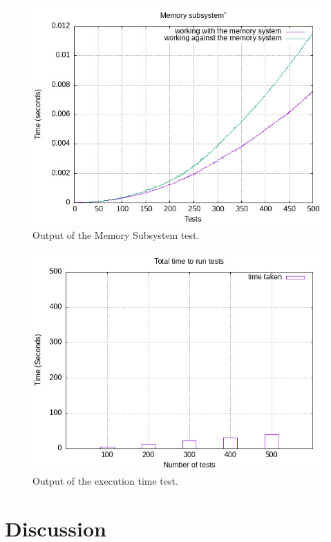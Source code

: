 \documentclass[12pt]{article}
\begin{document}
\begin{figure}[htbp]
\centering
\includegraphics[width=1.0\textwidth]{../../data/ee_course/plot_memsys.jpg} %
\caption{Output of the Memory Subsystem test.}
\label{fig:plot_memsys}
\end{figure}

\begin{figure}[htbp]
\centering
\includegraphics[width=1.0\textwidth]{../../data/ee_course/plot_tests.jpg} %
\caption{Output of the execution time test.}
\label{fig:plot_time}
\end{figure}

\section{Discussion}\label{sec:discussion}
\end{document}
